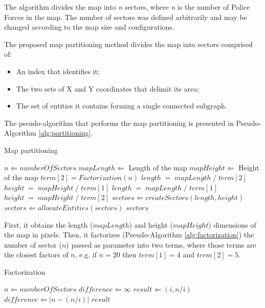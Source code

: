 \documentclass{llncs}
\begin{document}
The algorithm divides the map into {\it n} sectors, where {\it n} is the number of Police Forces in the map. The number of sectors was defined arbitrarily and may be changed according to the map size and configurations.

The proposed map partitioning method divides the map into sectors comprised of:
\begin{itemize}
\item An index that identifies it;
\item The two sets of X and Y coordinates that delimit its area;
\item The set of entities it contains forming a single connected subgraph.
\end{itemize}

The pseudo-algorithm that performs the map partitioning is presented in Pseudo-Algorithm \ref{alg:partitioning}.
\begin{algorithm}
  \caption{Map partitioning}
  \label{alg:partitioning}
  \begin{algorithmic}
    \REQUIRE $n \Leftarrow numberOfSectors$
    \STATE
    \STATE $mapLength \Leftarrow$ Length of the map
    \STATE $mapHeight \Leftarrow$ Height of the map
    \STATE $term[2] = Factorization(n)$ 
      \STATE $length\;=\;mapLength\;/\;term[2]$
      \STATE $height\;=\;mapHeight\;/\;term[1]$
    \ELSE
      \STATE $length\;=\;mapLength\;/\;term[1]$
      \STATE $height\;=\;mapHeight\;/\;term[2]$
    \ENDIF
    \STATE $sectors \Leftarrow createSectors(length, height)$
    \STATE $sectors \Leftarrow allocateEntities(sectors)$
    \RETURN $sectors$
  \end{algorithmic}
\end{algorithm}

First, it obtains the length ($mapLength$) and height ($mapHeight$) dimensions of the map in pixels. Then, it factorizes (Pseudo-Algorithm \ref{alg:factorization}) the number of sector ($n$) passed as parameter into two terms, where those terms are the closest factors of $n$, e.g. if $n = 20$ then $term[1] = 4$ and $term[2] = 5$.
\begin{algorithm}
  \caption{Factorization}
  \label{alg:factorization}
  \begin{algorithmic}
    \REQUIRE $n \Leftarrow numberOfSectors$
    \STATE
    \STATE $difference \Leftarrow \infty$
          \STATE $result \Leftarrow (i, n / i)$
          \STATE $difference \Leftarrow \left|n - (n / i)\right|$ 
        \ENDIF
      \ENDIF
    \ENDFOR
    \RETURN $result$
  \end{algorithmic}
\end{algorithm}
\end{document}
